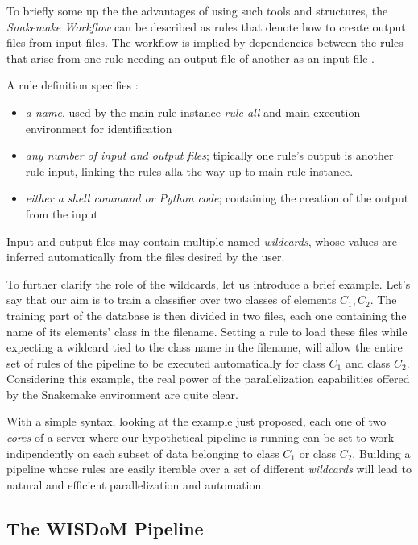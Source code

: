 \documentclass[12pt,openright,twoside,a4paper]{book}
\begin{document}
To briefly some up the the advantages of using such tools and structures, the \textit{Snakemake Workflow} can be described as rules that denote how to create output files from input files. The workflow is implied by dependencies between the rules that arise from one rule needing an output file of another as an input file \cite{SnakeMake}.

A rule definition specifies :

\begin{itemize}
\item \textit{a name}, used by the main rule instance \textit{rule all} and main execution environment for identification
\item \textit{any number of input and output files}; tipically one rule's output is another rule input, linking the rules alla the way up to main rule instance.
\item  \textit{either a shell command or Python code}; containing the creation of the output from the input
\end{itemize} 
Input and output files may contain multiple named \textit{wildcards}, whose values are inferred automatically from the files desired by the user.

To further clarify the role of the wildcards, let us introduce a brief example.
Let's say that our aim is to train a classifier over two classes of elements $C_1,C_2$. The training part of the database is then divided in two files, each one containing the name of its elements' class in the filename.
Setting a rule to load these files while expecting a wildcard tied to the class name in the filename, will allow the entire set of rules of the pipeline to be executed automatically for class $C_1$ and class $C_2$.
Considering this example, the real power of the parallelization capabilities offered by the Snakemake environment are quite clear.

With a simple syntax, looking at the example just proposed, each one of two \textit{cores} of a server where our hypothetical pipeline is running can be set to work indipendently on each subset of data belonging to class $C_1$ or class $C_2$.
Building a pipeline whose rules are easily iterable over a set of different \textit{wildcards} will lead to natural and efficient parallelization and automation.
\clearpage
\subsection{The WISDoM Pipeline}
\end{document}
